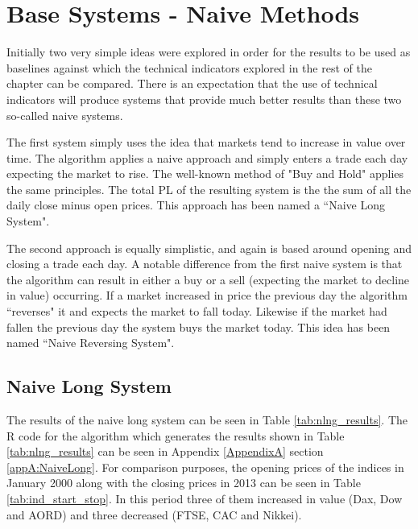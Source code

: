 \section{Base Systems - Naive Methods}
Initially two very simple ideas were explored in order for the results to be used as baselines against which the technical indicators explored in the rest of the chapter can be compared. There is an expectation that the use of technical indicators will produce systems that provide much better results than these two so-called naive systems.

The first system simply uses the idea that markets tend to increase in value over time. The algorithm applies a naive approach and simply enters a trade each day expecting the market to rise. The well-known method of "Buy and Hold" applies the same principles. The total PL of the resulting system is the the sum of all the daily close minus open prices. This approach has been named a \textquotedblleft Naive Long System".

The second approach is equally simplistic, and again is based around opening and closing a trade each day. A notable difference from the first naive system is that the algorithm can result in either a buy or a sell (expecting the market to decline in value) occurring. If a market increased in price the previous day the algorithm \textquotedblleft reverses" it and expects the market to fall today. Likewise if the market had fallen the previous day the system buys the market today. This idea has been named \textquotedblleft Naive Reversing System".

\subsection{Naive Long System}
The results of the naive long system can be seen in Table \ref{tab:nlng_results}. The R code for the algorithm which generates the results shown in Table \ref{tab:nlng_results} can be seen in Appendix \ref{AppendixA} section \ref{appA:NaiveLong}. For comparison purposes, the opening prices of the indices in January 2000 along with the closing prices in 2013 can be seen in Table \ref{tab:ind_start_stop}. In this period three of them increased in value (Dax, Dow and AORD) and three decreased (FTSE, CAC and Nikkei).

